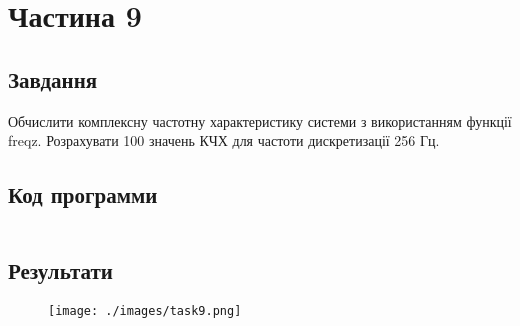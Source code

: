 \section{Частина 9}
\label{sec:task9}

\subsection{Завдання}
\label{subsec:task9_task}

Обчислити комплексну частотну характеристику системи з
використанням функції freqz. Розрахувати 100 значень КЧХ для частоти
дискретизації 256 Гц.

\subsection{Код программи}
\label{subsec:task9_code}
\inputminted{python}{../src/task9.py}

\subsection{Результати}
\label{subsec:task9_results}

\begin{figure}[!ht]
    \centering
    \texttt{[image: ./images/task9.png]}
\end{figure}
